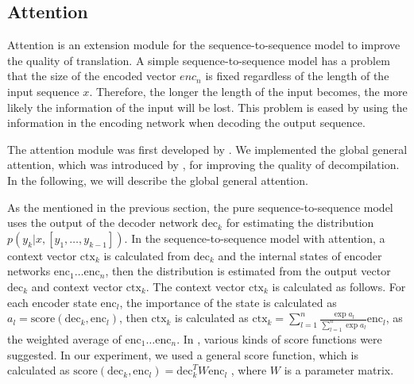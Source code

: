 \documentclass[senior,final,11pt]{iscs-thesis}
\begin{document}
\subsection{Attention}
Attention is an extension module for the sequence-to-sequence model to improve the quality of translation. 
A simple sequence-to-sequence model has a problem that the size of the encoded vector $enc_{n}$ is fixed 
regardless of the length of the input sequence $x$. 
Therefore, the longer the length of the input becomes, the more likely the information of the input will be lost.
This problem is eased by using the information in the encoding network when decoding the output sequence.

The attention module was first developed by \citet{attention_paper}.
We implemented the global general attention, which was introduced by \citet{dot_attention}, for improving the quality of decompilation.
In the following, we will describe the global general attention.

As the mentioned in the previous section, the pure sequence-to-sequence model uses the output of the decoder network $ \mathrm{dec}_{k} $ for estimating 
the distribution $ p(y_k|x,[y_1,\dots,y_{k-1}]) $.
In the sequence-to-sequence model with attention, 
a context vector $ \mathrm{ctx}_{k} $ is calculated from $ \mathrm{dec}_{k} $ and the internal states of encoder networks $ \mathrm{enc}_{1} \dots \mathrm{enc}_{n} $, 
then the distribution is estimated from the output vector $ \mathrm{dec}_{k} $ and context vector $ \mathrm{ctx}_{k} $.
The context vector $ \mathrm{ctx}_{k} $ is calculated as follows.
For each encoder state $ \mathrm{enc}_{l} $, the importance of the state is calculated as $ a_{l} = \mathrm{score}(\mathrm{dec}_{k},\mathrm{enc}_{l}) $,
then $ \mathrm{ctx}_{k} $ is calculated as $ \mathrm{ctx}_{k} = \sum_{l=1}^{n} \frac{\exp{a_{l}}}{\sum_{l=1}^{n}\exp{a_{l}}} \mathrm{enc}_{l} $, 
as the weighted average of $ \mathrm{enc}_{1} \dots \mathrm{enc}_{n} $.
In \citet{dot_attention}, various kinds of score functions were suggested.
In our experiment, we used a general score function, which is calculated as $ \mathrm{score}(\mathrm{dec}_{k},\mathrm{enc}_{l}) = \mathrm{dec}_{k}^T W \mathrm{enc}_{l} $ ,
where $ W $ is a parameter matrix.


\end{document}
